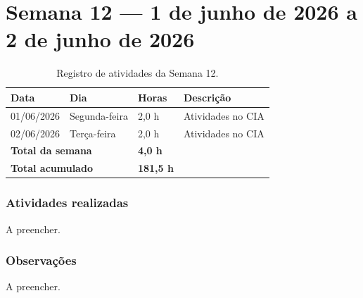 
\section{Semana 12 --- 1 de junho de 2026 a 2 de junho de 2026}

\begin{table}[H]
\centering
\caption{Registro de atividades da Semana 12.}
\begin{tabular}{llll}
\toprule
\textbf{Data} & \textbf{Dia} & \textbf{Horas} & \textbf{Descrição} \\
\midrule
01/06/2026 & Segunda-feira & 2,0 h & Atividades no CIA \\
02/06/2026 & Terça-feira & 2,0 h & Atividades no CIA \\
\midrule
\multicolumn{2}{l}{\textbf{Total da semana}} & \textbf{4,0 h} & \\
\multicolumn{2}{l}{\textbf{Total acumulado}} & \textbf{181,5 h} & \\
\bottomrule
\end{tabular}
\end{table}

\subsubsection*{Atividades realizadas}

A preencher.

\subsubsection*{Observações}

A preencher.
